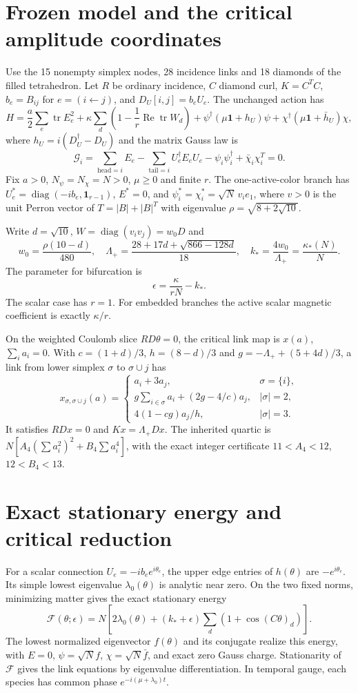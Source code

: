 \documentclass[11pt,a4paper]{article}
\newcommand{\id}{\mathbf1}\newcommand{\tr}{\operatorname{tr}}\newcommand{\diag}{\operatorname{diag}}\newcommand{\Rea}{\operatorname{Re}}
\begin{document}
\newpage
\section{Frozen model and the critical amplitude coordinates}
Use the 15 nonempty simplex nodes, 28 incidence links and 18 diamonds of the filled tetrahedron. Let $R$ be ordinary incidence, $C$ diamond curl, $K=C^TC$, $b_e=B_{ij}$ for $e=(i\leftarrow j)$, and $D_U[i,j]=b_eU_e$. The unchanged action has
\[
H=\frac a2\sum_e\tr E_e^2+\kappa\sum_d\left(1-\frac1r\Rea\tr W_d\right)
+\psi^\dagger(\mu\id+h_U)\psi+\chi^\dagger(\mu\id+\bar h_U)\chi,
\]
where $h_U=i(D_U^\dagger-D_U)$ and the matrix Gauss law is
\[
\mathcal G_i=\sum_{\mathrm{head}=i}E_e-\sum_{\mathrm{tail}=i}U_e^\dagger E_eU_e
-\psi_i\psi_i^\dagger+\bar\chi_i\chi_i^T=0.
\]
Fix $a>0$, $N_\psi=N_\chi=N>0$, $\mu\ge0$ and finite $r$. The one-active-color branch has $U_e^*=\diag(-ib_e,\id_{r-1})$, $E^*=0$, and $\psi_i^*=\chi_i^*=\sqrt N\,v_i e_1$, where $v>0$ is the unit Perron vector of $T=|B|+|B|^T$ with eigenvalue $\rho=\sqrt{8+2\sqrt{10}}$.

Write $d=\sqrt{10}$, $W=\diag(v_iv_j)=w_0D$ and
\[
w_0=\frac{\rho(10-d)}{480},\quad
\Lambda_+=\frac{28+17d+\sqrt{866-128d}}{18},\quad
k_* =\frac{4w_0}{\Lambda_+}=\frac{\kappa_*(N)}N.
\]
The parameter for bifurcation is
\begin{equation}
\boxed{\epsilon=\frac{\kappa}{rN}-k_*.}\label{eq:epsilon}
\end{equation}
The scalar case has $r=1$. For embedded branches the active scalar magnetic coefficient is exactly $\kappa/r$.

On the weighted Coulomb slice $RD\theta=0$, the critical link map is $x(a)$, $\sum_i a_i=0$. With $c=(1+d)/3$, $h=(8-d)/3$ and $g=-\Lambda_++(5+4d)/3$, a link from lower simplex $\sigma$ to $\sigma\cup j$ has
\[
x_{\sigma,\sigma\cup j}(a)=
\begin{cases}
a_i+3a_j,&\sigma=\{i\},\\
g\sum_{i\in\sigma}a_i+(2g-4/c)a_j,&|\sigma|=2,\\
4(1-cg)a_j/h,&|\sigma|=3.
\end{cases}
\]
It satisfies $RDx=0$ and $Kx=\Lambda_+Dx$. The inherited quartic is
$N[A_4(\sum a_i^2)^2+B_4\sum a_i^4]$, with the exact integer certificate $11<A_4<12$, $12<B_4<13$.

\newpage
\section{Exact stationary energy and critical reduction}
For a scalar connection $U_e=-ib_e e^{i\theta_e}$, the upper edge entries of $h(\theta)$ are $-e^{i\theta_e}$. Its simple lowest eigenvalue $\lambda_0(\theta)$ is analytic near zero. On the two fixed norms, minimizing matter gives the exact stationary energy
\[
\mathcal F(\theta;\epsilon)=N\left[2\lambda_0(\theta)
+(k_*+\epsilon)\sum_d(1+\cos(C\theta)_d)\right].
\]
The lowest normalized eigenvector $f(\theta)$ and its conjugate realize this energy, with $E=0$, $\psi=\sqrt N f$, $\chi=\sqrt N\bar f$, and exact zero Gauss charge. Stationarity of $\mathcal F$ gives the link equations by eigenvalue differentiation. In temporal gauge, each species has common phase $e^{-i(\mu+\lambda_0)t}$.
\end{document}
